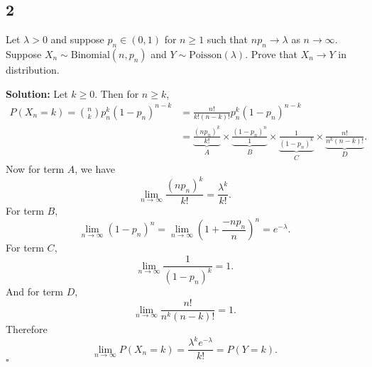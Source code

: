 \documentclass[12pt]{article}
\newcounter{ProofCounter}
\newenvironment{Solution}{\stepcounter{ProofCounter}\textbf{Solution:}}{\hfill$\square$}
\newcommand\toinf{\rightarrow\infty}
\newcommand{\linf}[1]{\lim_{#1\rightarrow\infty}}
\begin{document}
\subsection*{2}
\begin{tcolorbox}
  Let $\lambda > 0$ and suppose $p_n \in (0, 1)$ for $n \geq 1$ such that $np_n \rightarrow \lambda$ as $n\toinf$. Suppose $X_n \sim \text{Binomial}(n, p_n)$ and $Y \sim \text{Poisson}(\lambda)$. Prove that $X_n \rightarrow Y$ in distribution.
\end{tcolorbox}
\begin{Solution}
  Let $k \geq 0$. Then for $n \geq k$,
  \begin{align}
    P(X_n = k) = \binom{n}{k} p_n^k(1 - p_n)^{n-k} & = \frac{n!}{k!(n-k)!} p_n^k(1 - p_n)^{n-k} \nonumber \\
    & = \underbrace{\frac{(np_n)^{k}}{k!}}_{A} \times \underbrace{\frac{(1-p_n)^n}{1}}_{B} \times \underbrace{\frac{1}{(1-p_n)^k}}_{C} \times \underbrace{\frac{n!}{n^k(n-k)!}}_{D}.
    \label{2.1}
  \end{align}
  Now for term $A$, we have
  \begin{equation}
    \lim_{n\rightarrow\infty} \frac{(np_n)^{k}}{k!} = \frac{\lambda^k}{k!}.
    \label{2.2}
  \end{equation}
  For term $B$,
  \begin{equation}
    \linf{n} (1 - p_n)^n = \linf{n} \left( 1 + \frac{-np_n}{n} \right)^n = e^{-\lambda}.
    \label{2.3}
  \end{equation}
  For term $C$,
  \begin{equation}
    \linf{n} \frac{1}{(1 - p_n)^k} = 1.
    \label{2.4}
  \end{equation}
  And for term $D$,
  \begin{equation}
    \linf{n} \frac{n!}{n^k(n-k)!} = 1.
    \label{2.5}
  \end{equation}
  Therefore
  \begin{equation}
    \linf{n} P(X_n = k) = \frac{\lambda^k e^{-\lambda}}{k!} = P(Y = k).
    \label{2.6}
  \end{equation}
\end{Solution}
\end{document}

